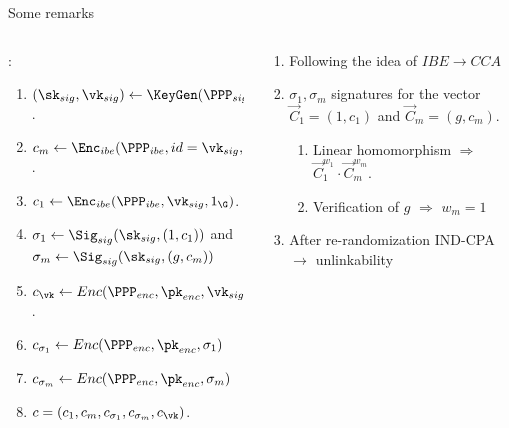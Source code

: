 \begin{frame}{Some remarks}

  \begin{columns}
    \begin{column}{0.5\textwidth}
      \tiny
          {:}          
          \begin{enumerate}      
          \item $(\sk_{sig}, \vk_{sig}) \gets \KeyGen(\PPP_{sig})$.
          \item $ c_m \gets \Enc_{ibe}(\PPP_{ibe}, id = \vk_{sig}, m)$.
          \item $c_1 \gets \Enc_{ibe}(\PPP_{ibe}, \vk_{sig}, 1_\G)$. 
          \item $\sigma_1 \gets \Sig_{sig}(\sk_{sig}, (1,c_1))$ and $\sigma_m \gets \Sig_{sig}(\sk_{sig}, (g,c_m))$ 
          \item $c_{\vk} \gets Enc(\PPP_{enc}, \pk_{enc}, \vk_{sig})$.
          \item $c_{\sigma_1} \gets Enc(\PPP_{enc}, \pk_{enc}, \sigma_1)$
          \item $c_{\sigma_m} \gets Enc(\PPP_{enc}, \pk_{enc}, \sigma_m)$
          \item $c = (c_1, c_m, c_{\sigma_1}, c_{\sigma_m}, c_{\vk})$.
          \end{enumerate}
      
    \end{column}

    \begin{column}{0.5\textwidth}
      \begin{enumerate}
      \item Following the idea of $IBE \to CCA$~\cite{DBLP:conf/eurocrypt/CanettiHK04}
      \item $\sigma_1, \sigma_m$ signatures for the vector $\vec{C}_1 = (1, c_1)$ and $\vec{C}_m = (g,c_m)$. 
        \begin{enumerate}
        \item Linear homomorphism $\Rightarrow$ $\vec{C}_1^{w_1} \cdot \vec{C}_m^{w_m}$. 

        \item Verification of $g$ $\Rightarrow$ $w_m = 1$

        \end{enumerate}
      \item After re-randomization IND-CPA $\to$ unlinkability
      \end{enumerate}
    \end{column}
  \end{columns}
  
\end{frame}



